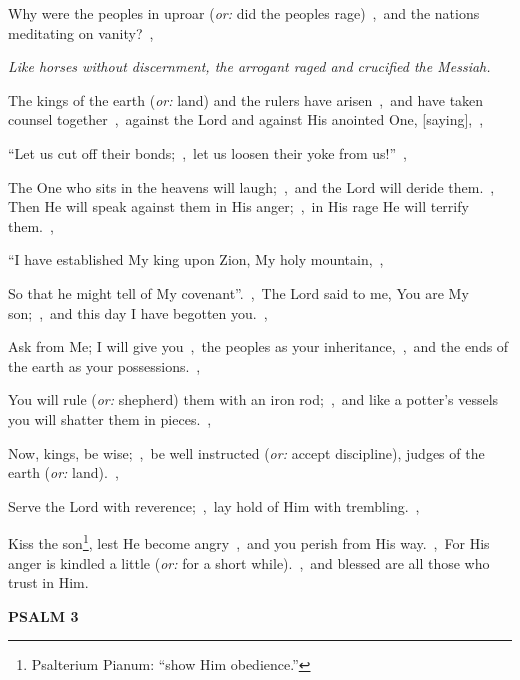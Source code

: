 \documentclass[12pt,twoside,a5paper]{article}
\newcommand{\psalm}[1]{\textbf{PSALM {#1}}}
\newcommand{\qanona}[1]{{\liturgicalhint{Qanona.} \emph{#1}}}
\newcommand{\translationoption}[1]{\emph{or:} #1}
\begin{document}
\begin{normalparskip}
  Why were the peoples in uproar (\translationoption{did the peoples rage})~\sep\ and the nations meditating on vanity?~\sep

  \qanona{Like horses without discernment, the arrogant raged and crucified the Messiah.}

  The kings of the earth (\translationoption{land}) and the rulers have arisen~\sep\ and have taken counsel together~\sep\ against the Lord and against His anointed One, [saying],~\sep

  ``Let us cut off their bonds;~\sep\ let us loosen their yoke from us!''~\sep

  The One who sits in the heavens will laugh;~\sep\ and the Lord will deride them.~\sep
  Then He will speak against them in His anger;~\sep\ in His rage He will terrify them.~\sep

  ``I have established My king upon Zion, My holy mountain,~\sep

  So that he might tell of My covenant''.~\sep\ The Lord said to me, You are My son;~\sep\ and this day I have begotten you.~\sep

  Ask from Me; I will give you~\sep\ the peoples as your inheritance,~\sep\ and the ends of the earth as your possessions.~\sep

  You will rule (\translationoption{shepherd}) them with an iron rod;~\sep\ and like a potter's vessels you will shatter them in pieces.~\sep

  Now, kings, be wise;~\sep\ be well instructed (\translationoption{accept discipline}), judges of the earth (\translationoption{land}).~\sep

  Serve the Lord with reverence;~\sep\ lay hold of Him with trembling.~\sep

  Kiss the son\footnote{Psalterium Pianum: ``show Him obedience.''}, lest He become angry~\sep\ and you perish from His way.~\sep\ For His anger is kindled a little (\translationoption{for a short while}).~\sep\ and blessed are all those who trust in Him.
\end{normalparskip}

\psalm{3}
\end{document}
